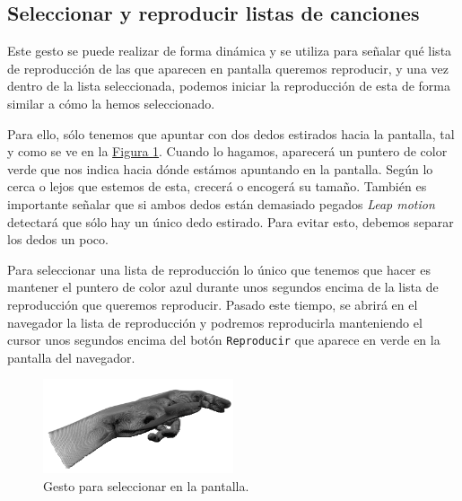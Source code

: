 \documentclass[10pt,a4paper,spanish]{article}
\begin{document}


\subsection{\textcolor{verde}Seleccionar y reproducir listas de canciones}

Este gesto se puede realizar de forma dinámica y se utiliza para señalar qué lista de reproducción de las que aparecen en pantalla queremos reproducir, y una vez dentro de la lista seleccionada, podemos iniciar la reproducción de esta de forma similar a cómo la hemos seleccionado.

Para ello, sólo tenemos que apuntar con dos dedos estirados hacia la pantalla, tal y como se ve en la \hyperref[point]{Figura \ref*{point}}. Cuando lo hagamos, aparecerá un puntero de color verde que nos indica hacia dónde estámos apuntando en la pantalla. Según lo cerca o lejos que estemos de esta, crecerá o encogerá su tamaño. También es importante señalar que si ambos dedos están demasiado pegados \textit{Leap motion} detectará que sólo hay un único dedo estirado. Para evitar esto, debemos separar los dedos un poco.

Para seleccionar una lista de reproducción lo único que tenemos que hacer es mantener el puntero de color azul durante unos segundos encima de la lista de reproducción que queremos reproducir. Pasado este tiempo, se abrirá en el navegador la lista de reproducción y podremos reproducirla manteniendo el cursor unos segundos encima del botón \texttt{Reproducir} que aparece en verde en la pantalla del navegador. 

\begin{figure}[H]
    \centering     
    \includegraphics[width=0.5\textwidth]{images/point}
    \caption{Gesto para seleccionar en la pantalla.}
    \label{point}
\end{figure}
\end{document}
